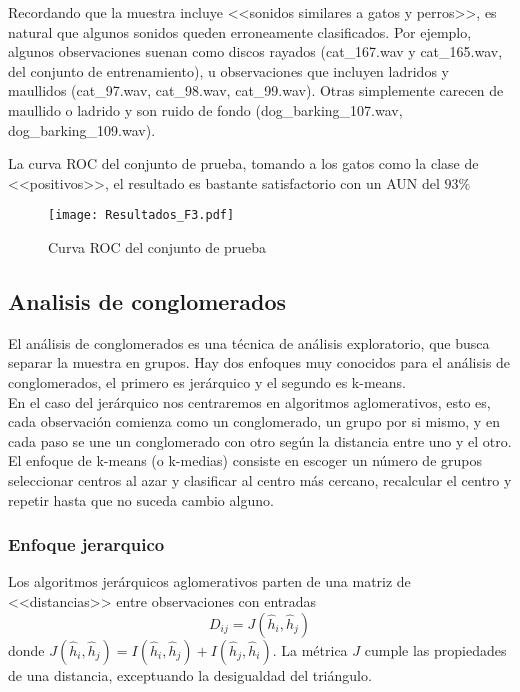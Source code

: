 \documentclass[twocolumn,10pt]{asme2ej}
\begin{document}
Recordando que la muestra incluye <<sonidos similares a gatos y perros>>, es natural que algunos sonidos queden erroneamente clasificados. Por ejemplo, algunos observaciones suenan como discos rayados (cat\_167.wav y cat\_165.wav, del conjunto de entrenamiento), u observaciones que incluyen ladridos y maullidos (cat\_97.wav, cat\_98.wav, cat\_99.wav). Otras simplemente carecen de maullido o ladrido y son ruido de fondo (dog\_barking\_107.wav, dog\_barking\_109.wav).

La curva ROC del conjunto de prueba, tomando a los gatos como la clase de <<positivos>>, el resultado es bastante satisfactorio con un AUN del $93\%$
\begin{figure}[h]
  \centering
    \texttt{[image: Resultados\_F3.pdf]}
  \caption{Curva ROC del conjunto de prueba}
  \label{plot:curva_ro_prue}
\end{figure}
\subsection*{Analisis de conglomerados} %
\label{sub:analisis_de_conglomerados}
El an\'alisis de conglomerados es una t\'ecnica de an\'alisis exploratorio, que busca separar la muestra en grupos\cite{GOLDSTEIN}. Hay dos enfoques muy conocidos para el an\'alisis de conglomerados, el primero es jer\'arquico y el segundo es k-means.\\

 En el caso del jer\'arquico nos centraremos en algoritmos aglomerativos, esto es, cada observaci\'on comienza como un conglomerado, un grupo por si mismo, y en cada paso se une un conglomerado con otro seg\'un la distancia entre uno y el otro.\\

El enfoque de k-means (o k-medias) consiste en escoger un n\'umero de grupos seleccionar centros al azar y clasificar al centro m\'as cercano, recalcular el centro y repetir hasta que no suceda cambio alguno.
\subsubsection*{Enfoque jerarquico} %
\label{ssub:enfoque_jerarquico}
Los algoritmos jer\'arquicos aglomerativos parten de una matriz de <<distancias>> entre observaciones con entradas 
$$D_{ij}=J(\hat{h}_i,\hat{h}_j)$$
donde $J(\hat{h}_i,\hat{h}_j)=I(\hat{h}_i,\hat{h}_j)+I(\hat{h}_j,\hat{h}_i)$. La m\'etrica $J$ cumple las propiedades de una distancia, exceptuando la desigualdad del tri\'angulo.\\
\end{document}
